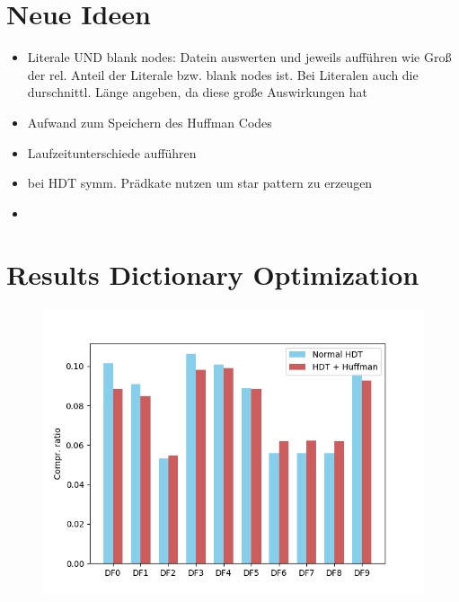 \documentclass[a4paper]{scrartcl}
\begin{document}
\section{Neue Ideen}
\begin{itemize}
	\item Literale UND blank nodes: Datein auswerten und jeweils aufführen wie Groß der rel. Anteil der Literale bzw. blank nodes ist. Bei Literalen auch die durschnittl. Länge angeben, da diese große Auswirkungen hat
	\item Aufwand zum Speichern des Huffman Codes
	\item Laufzeitunterschiede aufführen
	
	\item bei HDT symm. Prädkate nutzen um star pattern zu erzeugen
	\item 
\end{itemize}

\section{Results Dictionary Optimization}

\begin{figure}
	\centering
	\includegraphics[width=1\linewidth]{../thesis/figures/4_evaluation/dogFoodComprRatios}
	\caption{}
	\label{fig:dogfoodcomprratios}
\end{figure}
\end{document}
